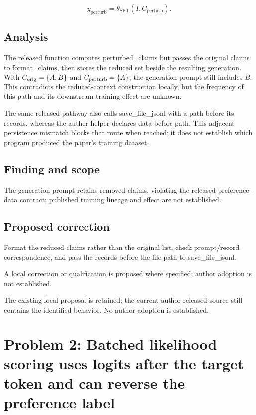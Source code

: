 \documentclass[11pt]{article}
\begin{document}
\[ y_{\mathrm{perturb}}=\theta_{\mathrm{SFT}}(I,C_{\mathrm{perturb}}). \]

\subsection*{Analysis}

The released function computes perturbed\_claims but passes the original claims to format\_claims, then stores the reduced set beside the resulting generation. With \(C_{\rm orig}=\{A,B\}\) and \(C_{\rm perturb}=\{A\}\), the generation prompt still includes \(B\). This contradicts the reduced-context construction locally, but the frequency of this path and its downstream training effect are unknown.

The same released pathway also calls save\_file\_jsonl with a path before its records, whereas the author helper declares data before path. This adjacent persistence mismatch blocks that route when reached; it does not establish which program produced the paper’s training dataset.

\subsection*{Finding and scope}

The generation prompt retains removed claims, violating the released preference-data contract; published training lineage and effect are not established.

\subsection*{Proposed correction}

Format the reduced claims rather than the original list, check prompt/record correspondence, and pass the records before the file path to save\_file\_jsonl.

A local correction or qualification is proposed where specified; author adoption is not established.

The existing local proposal is retained; the current author-released source still contains the identified behavior. No author adoption is established.

\section*{Problem 2: Batched likelihood scoring uses logits after the target token and can reverse the preference label}
\end{document}
